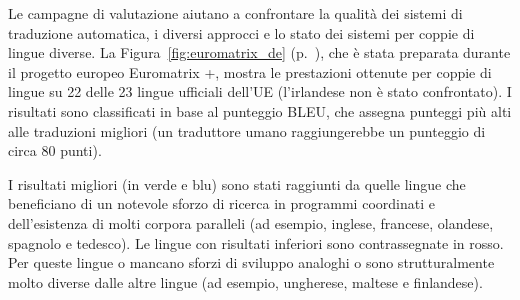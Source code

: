 \documentclass[]{../../metanetpaper}
\begin{document}
\begin{multicols}{2}
Le campagne di valutazione aiutano a confrontare la qualit\`{a} dei sistemi di
traduzione automatica, i diversi approcci e lo stato dei sistemi per coppie di
lingue diverse. La Figura~\ref{fig:euromatrix_de}
(p.~\pageref{fig:euromatrix_de}), che \`{e} stata preparata durante il progetto europeo Euromatrix +, mostra le prestazioni ottenute per coppie di
lingue su 22 delle 23 lingue ufficiali dell'UE (l'irlandese non \`{e} stato
confrontato). I risultati sono classificati in base al punteggio BLEU, che
assegna punteggi pi\`{u} alti alle traduzioni migliori \cite{bleu1} (un traduttore umano
raggiungerebbe un punteggio di circa 80 punti).


I risultati migliori (in verde e blu) sono stati raggiunti da quelle lingue che beneficiano di un notevole sforzo di ricerca in programmi coordinati e dell'esistenza di molti corpora paralleli (ad esempio, inglese, francese, olandese, spagnolo e tedesco). Le lingue con risultati inferiori sono contrassegnate in rosso. Per queste  lingue o mancano sforzi di sviluppo analoghi o sono strutturalmente molto diverse dalle altre lingue (ad esempio, ungherese, maltese e finlandese).



\end{multicols}
\end{document}
